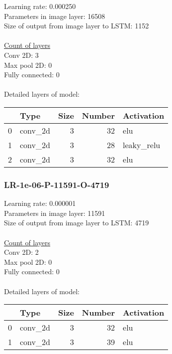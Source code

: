 Learning rate: 0.000250
\\Parameters in image layer: 16508
\\Size of output from image layer to LSTM: 1152
\\\\\underline{Count of layers} 
\\Conv 2D:           3\\Max pool 2D:      0\\Fully connected:  0
\\\\Detailed layers of model: \\\begin{tabular}{rlrrl}
\hline
    & Type    &   Size &   Number & Activation   \\
\hline
  0 & conv\_2d &      3 &       32 & elu          \\
  1 & conv\_2d &      3 &       28 & leaky\_relu   \\
  2 & conv\_2d &      3 &       32 & elu          \\
\hline
\end{tabular}\subsubsection*{LR-1e-06-P-11591-O-4719}
Learning rate: 0.000001
\\Parameters in image layer: 11591
\\Size of output from image layer to LSTM: 4719
\\\\\underline{Count of layers} 
\\Conv 2D:           2\\Max pool 2D:      0\\Fully connected:  0
\\\\Detailed layers of model: \\\begin{tabular}{rlrrl}
\hline
    & Type    &   Size &   Number & Activation   \\
\hline
  0 & conv\_2d &      3 &       32 & elu          \\
  1 & conv\_2d &      3 &       39 & elu          \\
\hline
\end{tabular}